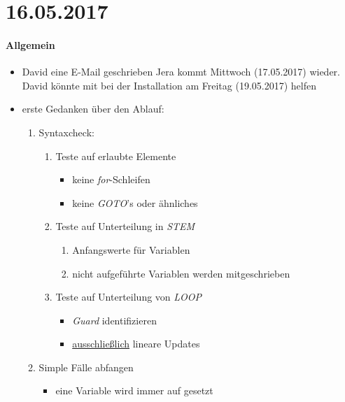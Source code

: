 \section*{16.05.2017}

\paragraph{Allgemein}
\begin{itemize}
	\item David eine E-Mail geschrieben \answer Jera kommt Mittwoch (17.05.2017) wieder. David könnte mit bei der Installation am Freitag (19.05.2017) helfen
	\item erste Gedanken über den Ablauf:
	\begin{enumerate}
		\item Syntaxcheck: 
			\begin{enumerate}
				\item Teste auf erlaubte Elemente
					\begin{itemize}
						\item keine \textit{for}-Schleifen
						\item keine \textit{GOTO}'s oder ähnliches
					\end{itemize}
				\item Teste auf Unterteilung in \emph{STEM}
					\begin{enumerate}
						\item Anfangswerte für Variablen
						\item nicht aufgeführte Variablen werden mitgeschrieben
					\end{enumerate}
				\item Teste auf Unterteilung von \emph{LOOP}
					\begin{itemize}
						\item \textit{Guard} identifizieren 
						\item \underline{ausschließlich} lineare Updates
					\end{itemize}
			\end{enumerate}
		\item Simple Fälle abfangen
			\begin{itemize}
				\item eine Variable wird immer auf  gesetzt
			\end{itemize}
	\end{enumerate}
\end{itemize}

